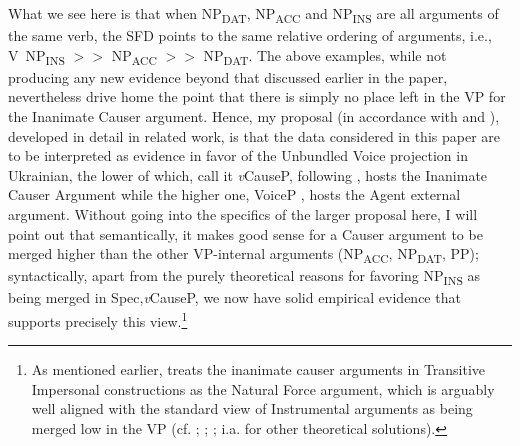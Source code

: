 \documentclass[output=paper,colorlinks,citecolor=brown]{langscibook}
\begin{document}
\noindent What we see here is that when NP\textsubscript{DAT}, NP\textsubscript{ACC} and NP\textsubscript{INS} are all arguments of the same verb, the SFD points to the same relative ordering of arguments, i.e., \mbox{V NP\textsubscript{INS}} $>>$ NP\textsubscript{ACC} $>>$ NP\textsubscript{DAT}. The above examples, while not producing any new evidence beyond that discussed earlier in the paper, nevertheless drive home the point that there is simply no place left in the VP for the Inanimate Causer argument. Hence, my proposal (in accordance with \citealt{Lavine2022,Lavine2023} and \citealt{Pylkkänen2002,Pylkkänen2008}), developed in detail in related work, is that the data considered in this paper are to be interpreted as evidence in favor of the Unbundled Voice projection in Ukrainian, the lower of which, call it \textit{v}CauseP, following \citet{Lavine2023}, hosts the Inanimate Causer Argument while the higher one, VoiceP \citep{ant:Kratzer1996}, hosts the Agent external argument. Without going into the specifics of the larger proposal here, I will point out that semantically, it makes good sense for a Causer argument to be merged higher than the other VP-internal arguments (NP\textsubscript{ACC}, NP\textsubscript{DAT}, PP); syntactically, apart from the purely theoretical reasons for favoring NP\textsubscript{INS} as being merged in Spec,\textit{v}CauseP, we now have solid empirical evidence that supports precisely this view.\footnote{As mentioned earlier, \citet{Lavine2023} treats the inanimate causer arguments in Transitive Impersonal constructions as the Natural Force argument, which is arguably well aligned with the standard view of Instrumental arguments as being merged low in the VP (cf. \citealt{Szucsich2007}; \citealt{Schäfer2008}; \citealt{JunghannsEtAl2017}; \citealt{Wood2017} i.a. for other theoretical solutions).}
\end{document}
